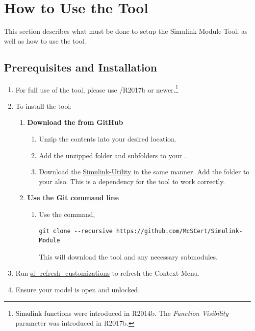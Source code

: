 \documentclass{article}
\makeatletter
\newcommand{\ToolName}{Simulink Module Tool\@\xspace}
\makeatother
\begin{document}
\section{How to Use the Tool}
This section describes what must be done to setup the \ToolName, as well as how to use the tool.

\subsection{Prerequisites and Installation}

\begin{enumerate}
	\item For full use of the tool, please use \matlab/\Simulink R2017b or newer.\footnote{Simulink functions were introduced in R2014b. The \emph{Function Visibility} parameter was introduced in R2017b.}

	\item To install the tool:
	\begin{enumerate}
		\item \textbf{Download the  from GitHub}
		\begin{enumerate} 
			\item Unzip the contents into your desired location. 
			\item Add the unzipped folder and subfolders to your \mpath. 
			\item Download the \href{https://github.com/McSCert/Simulink-Utility}{Simulink-Utility} in the same manner. Add the folder to your \mpath also. This is a dependency for the tool to work correctly.
		\end{enumerate}
		\item \textbf{Use the Git command line}
			\begin{enumerate}
				\item Use the command, \begin{verbatim}git clone --recursive https://github.com/McSCert/Simulink-Module\end{verbatim} This will download the tool and any necessary submodules.
			\end{enumerate}
	\end{enumerate}
	\item Run \href{https://www.mathworks.com/help/simulink/ug/registering-customizations.html}{sl\_refresh\_customizations} to refresh the Context Menu. 
	\item Ensure your model is open and unlocked.
\end{enumerate}
\end{document}
